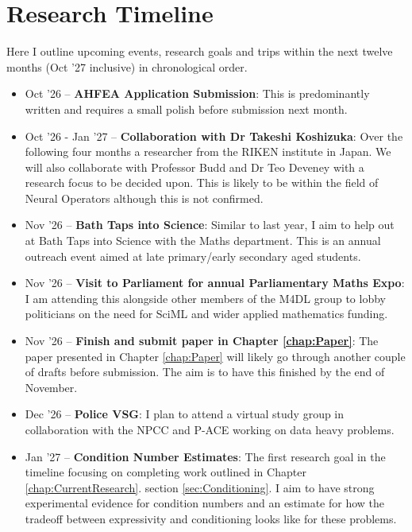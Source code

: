\documentclass[11pt, onecolumn]{report}
\begin{document}
\chapter{Research Timeline}
Here I outline upcoming events, research goals and trips within the next twelve months (Oct '27 inclusive) in chronological order. 
\begin{itemize}
	\item Oct '26 -- \textbf{AHFEA Application Submission}: This is predominantly written and requires a small polish before submission next month.
	
	\item Oct '26 - Jan '27 -- \textbf{Collaboration with Dr Takeshi Koshizuka}: Over the following four months a researcher from the RIKEN institute in Japan. We will also collaborate with Professor Budd and Dr Teo Deveney with a research focus to be decided upon. This is likely to be within the field of Neural Operators although this is not confirmed.
	
	\item Nov '26 -- \textbf{Bath Taps into Science}: Similar to last year, I aim to help out at Bath Taps into Science with the Maths department. This is an annual outreach event aimed at late primary/early secondary aged students. 
	
	\item Nov '26 -- \textbf{Visit to Parliament for annual Parliamentary Maths Expo}: I am attending this alongside other members of the M4DL group to lobby politicians on the need for SciML and wider applied mathematics funding. 
	
	\item Nov '26 -- \textbf{Finish and submit paper in Chapter \ref{chap:Paper}}: The paper presented in Chapter \ref{chap:Paper} will likely go through another couple of drafts before submission. The aim is to have this finished by the end of November.
	
	\item Dec '26 -- \textbf{Police VSG}: I plan to attend a virtual study group in collaboration with the NPCC and P-ACE working on data heavy problems.
	
	\item Jan '27 -- \textbf{Condition Number Estimates}: The first research goal in the timeline focusing on completing work outlined in Chapter \ref{chap:CurrentResearch}. section \ref{sec:Conditioning}. I aim to have strong experimental evidence for condition numbers and an estimate for how the tradeoff between expressivity and conditioning looks like for these problems.
	

\end{itemize}
\end{document}
